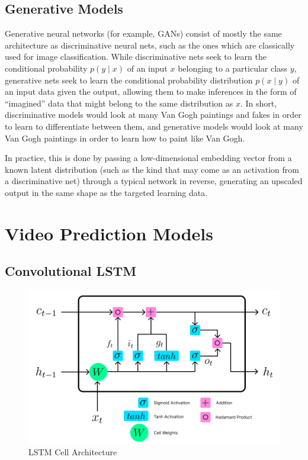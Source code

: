 \documentclass{scrartcl}
\begin{document}
\subsection{Generative Models}
\label{subsec:generative}

Generative neural networks (for example, GANs) consist of mostly the same
architecture as discriminative neural nets, such as the ones which are
classically used for image classification. While discriminative nets seek to
learn the conditional probability $p(y \mid x)$ of an input $x$ belonging to a
particular class $y$, generative nets seek to learn the conditional probability
distribution $p(x \mid y)$ of an input data given the output, allowing them to
make inferences in the form of ``imagined'' data that might belong to the same
distribution as $x$. In short, discriminative models would look at many Van
Gogh paintings and fakes in order to learn to differentiate between them, and
generative models would look at many Van Gogh paintings in order to learn how
to paint like Van Gogh.

In practice, this is done by passing a low-dimensional embedding vector from a
known latent distribution (such as the kind that may come as an activation from
a discriminative net) through a typical network in reverse, generating an
upscaled output in the same shape as the targeted learning data.

\section{Video Prediction Models}
\label{sec:families}

\subsection{Convolutional LSTM}
\label{subsec:conv_lstm}

\begin{figure}[H]
	\begin{center}
		\includegraphics[width=1\textwidth]{figures/lstmcell_arch.png}
	\end{center}
	\caption{LSTM Cell Architecture}
	\label{fig:rnn_arch}
\end{figure}
\end{document}

